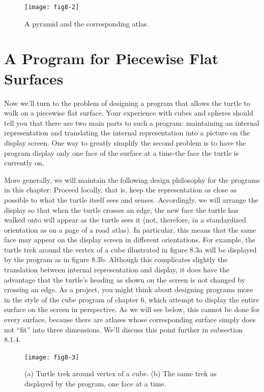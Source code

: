 \documentclass{book}
\begin{document}
\begin{figure}
\begin{center}
\texttt{[image: fig8-2]}
\caption{A pyramid and the corresponding atlas.}
\end{center}
\end{figure}

\section{A Program for Piecewise Flat Surfaces}

Now we'll turn to the problem of designing a program that allows the
turtle to walk on a piecewise flat surface. Your experience with cubes
and spheres should tell you that there are two main parts to such a
program: maintaining an internal representation and translating the
internal representation into a picture on the display screen. One way
to greatly simplify the second problem is to have the program display
only one face of the surface at a time-the face the turtle is currently
on.

More generally, we will maintain the following design philosophy for
the programs in this chapter: Proceed locally, that is, keep the representation as close as possible to what the turtle itself sees and senses.
Accordingly, we will arrange the display so that when the turtle crosses
an edge, the new face the turtle has walked onto will appear as the
turtle sees it (not, therefore, in a standardized orientation as on a page
of a road atlas). In particular, this means that the same face may appear on the display screen in different orientations. For example, the
turtle trek around the vertex of a cube illustrated in figure 8.3a will be
displayed by the program as in figure 8.3b. Although this complicates
slightly the translation between internal representation and display, it
does have the advantage that the turtle's heading as shown on the screen
is not changed by crossing an edge. As a project, you might think about
designing programs more in the style of the cube program of chapter 6,
which attempt to display the entire surface on the screen in perspective.
As we will see below, this cannot be done for every surface, because there
are atlases whose corresponding surface simply does not ``fit'' into three
dimensions. We'll discuss this point further in subsection 8.1.4.

\begin{figure}
\begin{center}
\texttt{[image: fig8-3]}
\caption{(a) Turtle trek around vertex of a cube. (b) The same trek as displayed by the program, one face at a time.}
\end{center}
\end{figure}
\end{document}
